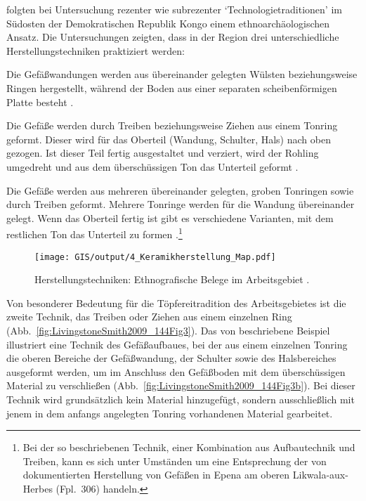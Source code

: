 \textcite{LivingstoneSmith.2009} folgten bei Untersuchung rezenter wie subrezenter \enquote*{Technologietraditionen} im Südosten der Demokratischen Republik Kongo einem ethnoarchäologischen Ansatz. Die Untersuchungen zeigten, dass in der Region drei unterschiedliche Herstellungstechniken praktiziert werden:
\begin{enumerate*}
\item Die Gefäßwandungen werden aus übereinander gelegten Wülsten beziehungsweise Ringen hergestellt, während der Boden aus einer separaten scheibenförmigen Platte besteht \parencites[8]{LivingstoneSmith.2008}[144 Abb.~2]{LivingstoneSmith.2009}.
\item Die Gefäße werden durch Treiben beziehungsweise Ziehen aus einem Tonring geformt. Dieser wird für das Oberteil (Wandung, Schulter, Hals) nach oben gezogen. Ist dieser Teil fertig ausgestaltet und verziert, wird der Rohling umgedreht und aus dem überschüssigen Ton das Unterteil geformt \parencites[9]{LivingstoneSmith.2008}[144 Abb.~3; Abb.~\ref{fig:LivingstoneSmith2009_144Fig3}]{LivingstoneSmith.2009}.
\item Die Gefäße werden aus mehreren übereinander gelegten, groben Tonringen sowie durch Treiben geformt. Mehrere Tonringe werden für die Wandung übereinander gelegt. Wenn das Oberteil fertig ist gibt es verschiedene Varianten, mit dem restlichen Ton das Unterteil zu formen \parencites[10]{LivingstoneSmith.2008}[144 Abb.~4]{LivingstoneSmith.2009}.\footnote{Bei der so beschriebenen Technik, einer Kombination aus Aufbautechnik und Treiben, kann es sich unter Umständen um eine Entsprechung der von \textcite{MpikaNgoma.1996} dokumentierten Herstellung von Gefäßen in Epena am oberen Likwala-aux-Herbes (Fpl.~306) handeln.}
\end{enumerate*}

\begin{figure*}[p]
	\centering
	\texttt{[image: GIS/output/4\_Keramikherstellung\_Map.pdf]}
	\caption{Herstellungstechniken: Ethnografische Belege im Arbeitsgebiet \parencites[nach][]{Eggert.1980c}{Wotzka.1995}{MpikaNgoma.1996}[Transparent:][]{Drost.1967}.}
	\label{fig:Keramikherstellung_Karte}
\end{figure*}

\vspace{1.5em}
\noindent Von besonderer Bedeutung für die Töpfereitradition des Arbeitsgebietes ist die zweite Technik, das Treiben oder Ziehen aus einem einzelnen Ring (Abb.~\ref{fig:LivingstoneSmith2009_144Fig3}). Das von \textcite{LivingstoneSmith.2009} beschriebene Beispiel illustriert eine Technik des Gefäßaufbaues, bei der aus einem einzelnen Tonring die oberen Bereiche der Gefäßwandung, der Schulter sowie des Halsbereiches ausgeformt werden, um im Anschluss den Gefäßboden mit dem überschüssigen Material zu verschließen (Abb.~\ref{fig:LivingstoneSmith2009_144Fig3b}). Bei dieser Technik wird grundsätzlich kein Material hinzugefügt, sondern ausschließlich mit jenem in dem anfangs angelegten Tonring vorhandenen Material gearbeitet.

